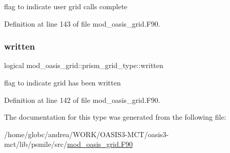 flag to indicate user grid calls complete 



Definition at line 143 of file mod\+\_\+oasis\+\_\+grid.\+F90.

\mbox{\label{structmod__oasis__grid_1_1prism__grid__type_a48d243ede1b306ac35bb9bbeff48785a}} 
\subsubsection{\texorpdfstring{written}{written}}
{\footnotesize\ttfamily logical mod\+\_\+oasis\+\_\+grid\+::prism\+\_\+grid\+\_\+type\+::written\hspace{0.3cm}{\ttfamily [private]}}



flag to indicate grid has been written 



Definition at line 142 of file mod\+\_\+oasis\+\_\+grid.\+F90.



The documentation for this type was generated from the following file\+:\begin{DoxyCompactItemize}
\item 
/home/globc/andrea/\+W\+O\+R\+K/\+O\+A\+S\+I\+S3-\/\+M\+C\+T/oasis3-\/mct/lib/psmile/src/\hyperlink{mod__oasis__grid_8_f90}{mod\+\_\+oasis\+\_\+grid.\+F90}\end{DoxyCompactItemize}
